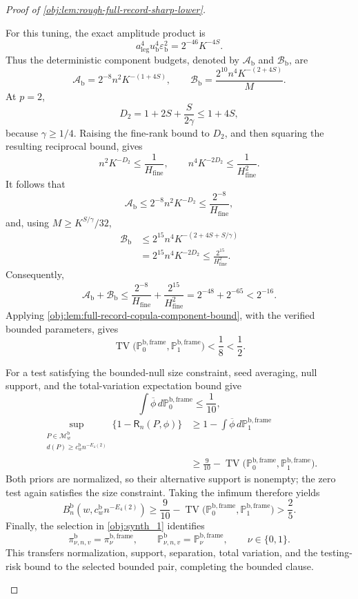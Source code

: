\begin{proof}[Proof of \cref{obj:lem:rough-full-record-sharp-lower}]
\begin{enumerate}
For this tuning, the exact amplitude product is
\[
a_{\mathrm{leg}}^4u_{\mathrm b}^4\varepsilon_{\mathrm b}^2
=2^{-46}K^{-4S}.
\]
Thus the deterministic component budgets, denoted by
\(\mathcal A_{\mathrm b}\) and \(\mathcal B_{\mathrm b}\), are
\[
\mathcal A_{\mathrm b}
=2^{-8}n^2K^{-(1+4S)},
\qquad
\mathcal B_{\mathrm b}
=\frac{2^{10}n^4K^{-(2+4S)}}{M}.
\]
At \(p=2\),
\[
D_2=1+2S+\frac{S}{2\gamma}
\le1+4S,
\]
because \(\gamma\ge1/4\). Raising the fine-rank bound to \(D_2\), and then squaring the resulting reciprocal bound, gives
\[
n^2K^{-D_2}\le\frac1{H_{\mathrm{fine}}},
\qquad
n^4K^{-2D_2}\le\frac1{H_{\mathrm{fine}}^2}.
\]
It follows that
\[
\mathcal A_{\mathrm b}
\le2^{-8}n^2K^{-D_2}
\le\frac{2^{-8}}{H_{\mathrm{fine}}},
\]
and, using \(M\ge K^{S/\gamma}/32\),
\[
\begin{aligned}
\mathcal B_{\mathrm b}
&\le
2^{15}n^4K^{-(2+4S+S/\gamma)}\\
&=
2^{15}n^4K^{-2D_2}
\le\frac{2^{15}}{H_{\mathrm{fine}}^2}.
\end{aligned}
\]
Consequently,
\[
\mathcal A_{\mathrm b}+\mathcal B_{\mathrm b}
\le
\frac{2^{-8}}{H_{\mathrm{fine}}}
+\frac{2^{15}}{H_{\mathrm{fine}}^2}
=
2^{-48}+2^{-65}<2^{-16}.
\]
Applying \cref{obj:lem:full-record-copula-component-bound}, with the verified bounded parameters, gives
\[
\operatorname{TV}
\bigl(\mathbb P_0^{\mathrm{b,frame}},
      \mathbb P_1^{\mathrm{b,frame}}\bigr)
<\frac18<\frac12.
\]

For a test satisfying the bounded-null size constraint, seed averaging, null support, and the total-variation expectation bound give
\[
\int\overline\phi\,d\mathbb P_0^{\mathrm{b,frame}}\le\frac1{10},
\]
\[
\begin{aligned}
\sup_{\substack{P\in\mathcal M_w^{\mathrm b}\\
d(P)\ge c_w^{\mathrm b}n^{-E_4(2)}}}
\{1-\mathsf R_n(P,\phi)\}
&\ge
1-\int\overline\phi\,d\mathbb P_1^{\mathrm{b,frame}}\\
&\ge
\frac9{10}
-\operatorname{TV}
\bigl(\mathbb P_0^{\mathrm{b,frame}},
      \mathbb P_1^{\mathrm{b,frame}}\bigr).
\end{aligned}
\]
Both priors are normalized, so their alternative support is nonempty; the zero test again satisfies the size constraint. Taking the infimum therefore yields
\[
B_n^{\mathrm b}\!\left(w,c_w^{\mathrm b}n^{-E_4(2)}\right)
\ge
\frac9{10}
-\operatorname{TV}
\bigl(\mathbb P_0^{\mathrm{b,frame}},
      \mathbb P_1^{\mathrm{b,frame}}\bigr)
>\frac25.
\]
Finally, the selection in \cref{obj:synth_1} identifies
\[
\pi^{\mathrm b}_{\nu,n,v}=\pi_\nu^{\mathrm{b,frame}},
\qquad
\mathbb P^{\mathrm b}_{\nu,n,v}
=\mathbb P_\nu^{\mathrm{b,frame}},
\qquad \nu\in\{0,1\}.
\]
This transfers normalization, support, separation, total variation, and the testing-risk bound to the selected bounded pair, completing the bounded clause.
\end{enumerate}
\end{proof}
